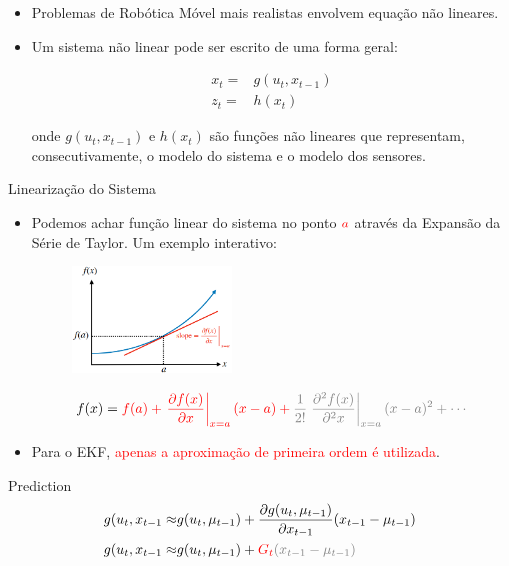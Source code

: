 \begin{itemize}
    \item Problemas de Robótica Móvel mais realistas envolvem equação não lineares.
    \item Um sistema não linear pode ser escrito de uma forma geral:
    
    \begin{equation}
        \begin{split}
        x_t = & g(u_t, x_{t-1})\\
        z_t = & h(x_t)
        \end{split}
    \end{equation}
    
onde $g(u_t, x_{t-1})$ e $h(x_t)$ são funções não lineares que representam, consecutivamente, 
o modelo do sistema e o modelo dos sensores.

\end{itemize}


Linearização do Sistema



\begin{itemize}
    \item Podemos achar função linear do sistema no ponto $\color{red}{a}$ através da Expansão da Série de Taylor. Um exemplo interativo: 

\begin{figure}
    \centering
    \includegraphics[width=0.4\textwidth]{chapters/chapter3/figures/taylor.png}
\end{figure}

\begin{equation}
    f(x) = \color{red}{f(a) + \left. \frac{\partial f(x)}{\partial x} \right\vert_{x=a}(x-a)} + 
    \color{gray}{\frac{1}{2!}\left. \frac{\partial^2 f(x)}{\partial^2 x} \right\vert_{x=a}(x-a)^2 + \cdots}
\end{equation}

    \item Para o EKF, \textcolor{red}{apenas a aproximação de primeira ordem é utilizada}.
\end{itemize}


Prediction
\begin{equation*}
    \begin{split}
        g(u_t, x_{t-1} \approx & g(u_t, \mu_{t-1}) + \frac{\partial g(u_t, \mu_{t-1}) }{\partial x_{t-1}}(x_{t-1}-\mu_{t-1}) \\
        g(u_t, x_{t-1} \approx & g(u_t, \mu_{t-1}) + \color{red}{G_t}\color{gray}{(x_{t-1}-\mu_{t-1})}
    \end{split}
\end{equation*}
            
